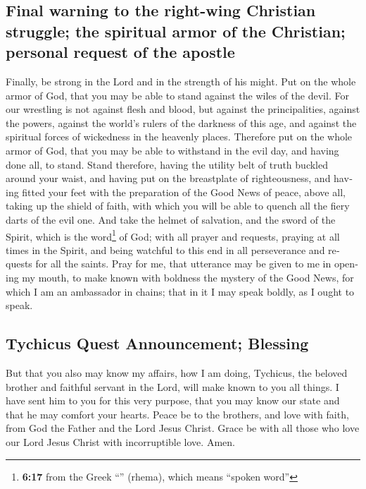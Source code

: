 \begin{paracol}{2}
\begin{otherlanguage}{english}
{\subsection{Final warning to the right-wing Christian struggle; the
spiritual armor of the Christian; personal request of the
apostle}\label{final-warning-to-the-right-wing-christian-struggle-the-spiritual-armor-of-the-christian-personal-request-of-the-apostle}}

 Finally, be strong in the Lord and in the strength of
his might.  Put on the whole armor of God, that you may
be able to stand against the wiles of the devil.  For our
wrestling is not against flesh and blood, but against the
principalities, against the powers, against the world's rulers of the
darkness of this age, and against the spiritual forces of wickedness in
the heavenly places.  Therefore put on the whole armor of
God, that you may be able to withstand in the evil day, and having done
all, to stand.  Stand therefore, having the utility belt
of truth buckled around your waist, and having put on the breastplate of
righteousness,  and having fitted your feet with the
preparation of the Good News of peace,  above all, taking
up the shield of faith, with which you will be able to quench all the
fiery darts of the evil one.  And take the helmet of
salvation, and the sword of the Spirit, which is the word\footnote{\textbf{6:17}
  from the Greek ``'' (rhema), which means ``spoken word''}
of God;  with all prayer and requests, praying at all
times in the Spirit, and being watchful to this end in all perseverance
and requests for all the saints.  Pray for me, that
utterance may be given to me in opening my mouth, to make known with
boldness the mystery of the Good News,  for which I am an
ambassador in chains; that in it I may speak boldly, as I ought to
speak.

\hypertarget{tychicus-quest-announcement-blessing}{%
\subsection{Tychicus Quest Announcement;
Blessing}\label{tychicus-quest-announcement-blessing}}

 But that you also may know my affairs, how I am doing,
Tychicus, the beloved brother and faithful servant in the Lord, will
make known to you all things.  I have sent him to you for
this very purpose, that you may know our state and that he may comfort
your hearts.  Peace be to the brothers, and love with
faith, from God the Father and the Lord Jesus Christ. 
Grace be with all those who love our Lord Jesus Christ with
incorruptible love. Amen. \end{otherlanguage}
\end{paracol}

